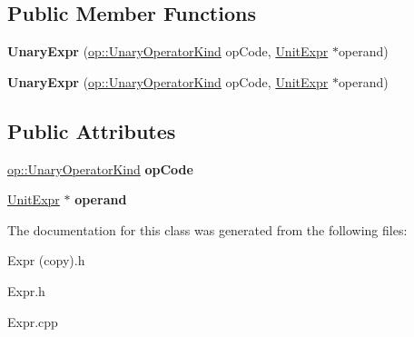 \subsection*{Public Member Functions}
\begin{DoxyCompactItemize}
\item 
\mbox{\label{classspan_1_1ir_1_1expr_1_1UnaryExpr_aef18ea3acac2a31dd3ce664eb42deadd}} 
{\bfseries Unary\+Expr} (\hyperlink{namespacespan_1_1ir_1_1op_ab88ceb1213c3473d4f5fc848509dd181}{op\+::\+Unary\+Operator\+Kind} op\+Code, \hyperlink{classspan_1_1ir_1_1expr_1_1UnitExpr}{Unit\+Expr} $\ast$operand)
\item 
\mbox{\label{classspan_1_1ir_1_1expr_1_1UnaryExpr_a6b8567c35a7b96f909bff41e13d601bf}} 
{\bfseries Unary\+Expr} (\hyperlink{namespacespan_1_1ir_1_1op_ab88ceb1213c3473d4f5fc848509dd181}{op\+::\+Unary\+Operator\+Kind} op\+Code, \hyperlink{classspan_1_1ir_1_1expr_1_1UnitExpr}{Unit\+Expr} $\ast$operand)
\end{DoxyCompactItemize}
\subsection*{Public Attributes}
\begin{DoxyCompactItemize}
\item 
\mbox{\label{classspan_1_1ir_1_1expr_1_1UnaryExpr_a7074043b3e6e97557ef1df01e93a26e6}} 
\hyperlink{namespacespan_1_1ir_1_1op_ab88ceb1213c3473d4f5fc848509dd181}{op\+::\+Unary\+Operator\+Kind} {\bfseries op\+Code}
\item 
\mbox{\label{classspan_1_1ir_1_1expr_1_1UnaryExpr_ac05be81012d5faff7afe5a626c3eec8f}} 
\hyperlink{classspan_1_1ir_1_1expr_1_1UnitExpr}{Unit\+Expr} $\ast$ {\bfseries operand}
\end{DoxyCompactItemize}


The documentation for this class was generated from the following files\+:\begin{DoxyCompactItemize}
\item 
Expr (copy).\+h\item 
Expr.\+h\item 
Expr.\+cpp\end{DoxyCompactItemize}
